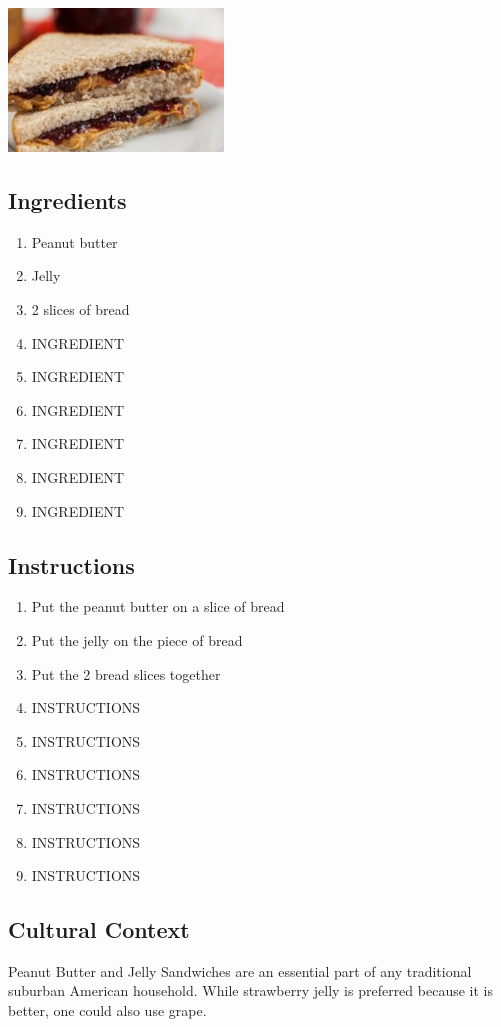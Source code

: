 \documentclass{book}
\begin{document}
\begin{center}
\vspace{.25in}
\includegraphics[height=1.5in]{images/pbj.jpg}
\end{center}

\textcolor{Sepia}{\section{Ingredients}}\fontsize{12}{12}\selectfont
\begin{multicols}{2}
\begin{enumerate}
\item Peanut butter
\item Jelly
\item 2 slices of bread
\item INGREDIENT
\item INGREDIENT
\item INGREDIENT
\item INGREDIENT
\item INGREDIENT
\item INGREDIENT
\\
\end{enumerate}
\end{multicols}

\textcolor{Sepia}{\section{Instructions}}\fontsize{12}{12}\selectfont
\begin{multicols}{2}
\begin{enumerate}
\item Put the peanut butter on a slice of bread
\item Put the jelly on the piece of bread
\item Put the 2 bread slices together
\item INSTRUCTIONS
\item INSTRUCTIONS
\item INSTRUCTIONS
\item INSTRUCTIONS
\item INSTRUCTIONS
\item INSTRUCTIONS
\\
\end{enumerate}
\end{multicols}

\textcolor{Sepia}{\section{Cultural Context}}\fontsize{14}{14}\selectfont
\noindent
Peanut Butter and Jelly Sandwiches are an essential part of any traditional suburban American household.
While strawberry jelly is preferred because it is better, one could also use grape.
\\
\end{document}
